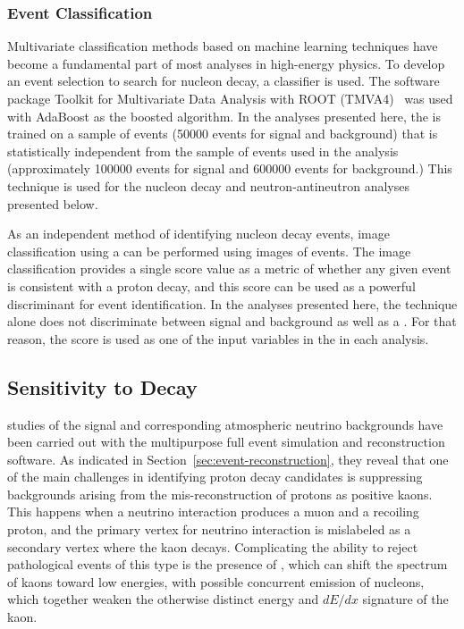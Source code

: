 \subsubsection{Event Classification}

Multivariate classification methods based on machine learning techniques have become a fundamental part of most analyses in high-energy physics. 
To develop an event selection to search for nucleon decay, a 
classifier is used. The software package Toolkit for Multivariate Data Analysis with ROOT (TMVA4)~\cite{Hocker:2007ht}
was used with AdaBoost as the boosted algorithm.  In the analyses presented here, the  is trained on a sample of  events (\num{50000} events for signal and background) that is statistically independent from the sample of  events used in the analysis (approximately \num{100000} events for signal and \num{600000} events for background.)  This technique is used for the nucleon decay and neutron-antineutron analyses presented below.

As an independent method of identifying nucleon decay events, image classification using a 
can be performed using \twod images of   events. The image classification provides a single score value as a metric of whether any given event is consistent with a proton decay, and this score can be used as a powerful discriminant for event identification.  In the analyses presented here, the  technique alone does not discriminate between signal and background as well as a .  For that reason, the  score is used as one of the input variables in the  in each analysis.

\subsection{Sensitivity to \ptoknubar Decay}
\label{subsec:nonaccel-ndk-nubarkplus}

 studies of the \ptoknubar signal and corresponding atmospheric neutrino backgrounds have been carried out with the  multipurpose full event simulation and reconstruction software.  As indicated in Section~\ref{sec:event-reconstruction},
they reveal that one of the main challenges in identifying proton decay candidates is suppressing backgrounds arising from the mis-reconstruction of protons as positive kaons. This happens when a  neutrino interaction produces a muon and a recoiling proton, and the primary vertex for neutrino interaction is mislabeled as a secondary vertex where the kaon decays.  Complicating the ability to reject pathological events of this type is the presence of , which can shift the spectrum of kaons toward low energies, with possible concurrent emission of nucleons, which together weaken the otherwise distinct energy and $dE/dx$ signature of the kaon. 

